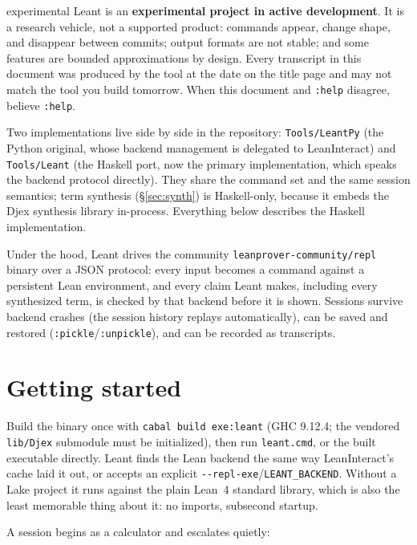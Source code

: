 \documentclass[11pt,oneside]{article}
\newcommand{\code}[1]{\texttt{#1}}
\begin{document}
\begin{notice}{experimental}
Leant is an \textbf{experimental project in active development}. It is
a research vehicle, not a supported product: commands appear, change
shape, and disappear between commits; output formats are not stable;
and some features are bounded approximations by design. Every
transcript in this document was produced by the tool at the date on
the title page and may not match the tool you build tomorrow. When
this document and \code{:help} disagree, believe \code{:help}.
\end{notice}

Two implementations live side by side in the repository:
\code{Tools/LeantPy} (the Python original, whose backend management is
delegated to LeanInteract) and \code{Tools/Leant} (the Haskell port,
now the primary implementation, which speaks the backend protocol
directly). They share the command set and the same session semantics;
term synthesis (\S\ref{sec:synth}) is Haskell-only, because it embeds
the Djex synthesis library in-process. Everything below describes the
Haskell implementation.

Under the hood, Leant drives the community
\code{leanprover-community/repl} binary over a JSON protocol: every
input becomes a command against a persistent Lean environment, and
every claim Leant makes, including every synthesized term, is
checked by that backend before it is shown. Sessions survive backend
crashes (the session history replays automatically), can be saved and
restored (\code{:pickle}/\code{:unpickle}), and can be recorded as
transcripts.

\section{Getting started}\label{sec:start}

Build the binary once with \code{cabal build exe:leant} (GHC 9.12.4;
the vendored \code{lib/Djex} submodule must be initialized), then run
\code{leant.cmd}, or the built executable directly. Leant finds the
Lean backend the same way LeanInteract's cache laid it out, or accepts
an explicit \code{-{}-repl-exe}/\code{LEANT\_BACKEND}. Without a Lake
project it runs against the plain Lean~4 standard library, which is
also the least memorable thing about it: no imports, subsecond
startup.

A session begins as a calculator and escalates quietly:
\end{document}
